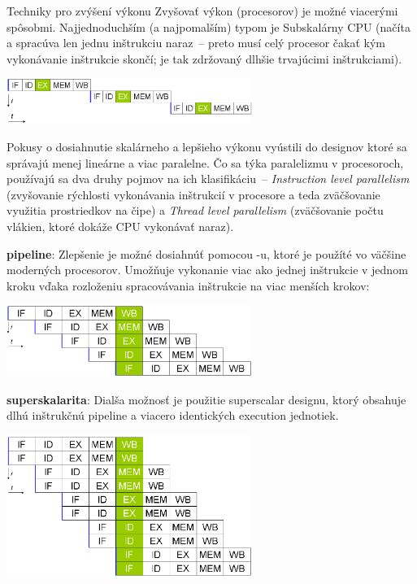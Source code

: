 \begin{obecne}{Techniky pro zvýšení výkonu}
Zvyšovať výkon (procesorov) je možné viacerými spôsobmi. Najjednoduchším (a najpomalším) typom je Subskalárny CPU (načíta a spracúva len jednu inštrukciu naraz~-- preto musí celý procesor čakať kým vykonávanie inštrukcie skončí; je tak zdržovaný dlhšie trvajúcimi inštrukciami). 

\begin{center}
\includegraphics[width=8cm]{informatika/operacne_systemy_a_hw/obrazky/Nopipeline.png}
\end{center}

Pokusy o dosiahnutie skalárneho a lepšieho výkonu vyústili do designov ktoré sa správajú menej lineárne a viac paralelne. Čo sa týka paralelizmu v procesoroch, používajú sa dva druhy pojmov na ich klasifikáciu~-- \emph{Instruction level parallelism} (zvyšovanie rýchlosti vykonávania inštrukcií v procesore a teda zväčšovanie využitia prostriedkov na čipe) a \emph{Thread level parallelism} (zväčšovanie počtu vlákien, ktoré dokáže CPU vykonávať naraz).
\begin{pitemize}
  \item \textbf{pipeline}: 
  Zlepšenie je možné dosiahnúť pomocou -u, ktoré je použíté vo väčšine moderných procesorov. Umožňuje vykonanie viac ako jednej inštrukcie v jednom kroku vďaka rozloženiu spracovávania inštrukcie na viac menších krokov: 
  \begin{center}
  \includegraphics[width=8cm]{informatika/operacne_systemy_a_hw/obrazky/Fivestagespipeline.png}
  \end{center}

  \item \textbf{superskalarita}: Dialša možnosť je použitie superscalar designu, ktorý obsahuje dlhú inštrukčnú pipeline a viacero identických execution jednotiek.  
  \begin{center}
  \includegraphics[width=8cm]{informatika/operacne_systemy_a_hw/obrazky/Superscalarpipeline.png}
  \end{center}	


\end{pitemize}
\end{obecne}
